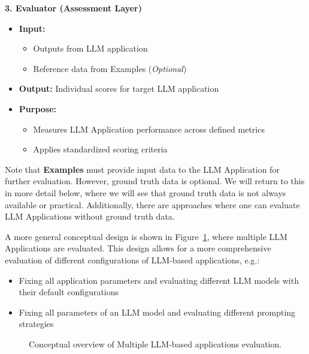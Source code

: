 \textbf{3. Evaluator (Assessment Layer)}
\begin{itemize}
    \item \textbf{Input:}
    \begin{itemize}
        \item Outputs from LLM application
        \item Reference data from Examples (\textit{Optional})
    \end{itemize}
    \item \textbf{Output:} Individual scores for target LLM application
    \item \textbf{Purpose:}
    \begin{itemize}
        \item Measures LLM Application performance across defined metrics
        \item Applies standardized scoring criteria
    \end{itemize}
\end{itemize}
Note that \textbf{Examples} must provide input data to the LLM Application for further evaluation. However, ground truth data is optional. We will return to this in more detail below, where we will see that ground truth data is not always available or practical. Additionally, there are approaches where one can evaluate LLM Applications without ground truth data.

A more general conceptual design is shown in Figure~\ref{fig:conceptual-multi}, where multiple LLM Applications are evaluated. This design allows for a more comprehensive evaluation of different configurations of LLM-based applications, e.g.:
\begin{itemize}
    \item Fixing all application parameters and evaluating different LLM models with their default configurations
    \item Fixing all parameters of an LLM model and evaluating different prompting strategies
\end{itemize}

\begin{figure}[h]
\centering

\caption{Conceptual overview of Multiple LLM-based applications evaluation.}
\label{fig:conceptual-multi}
\end{figure}

